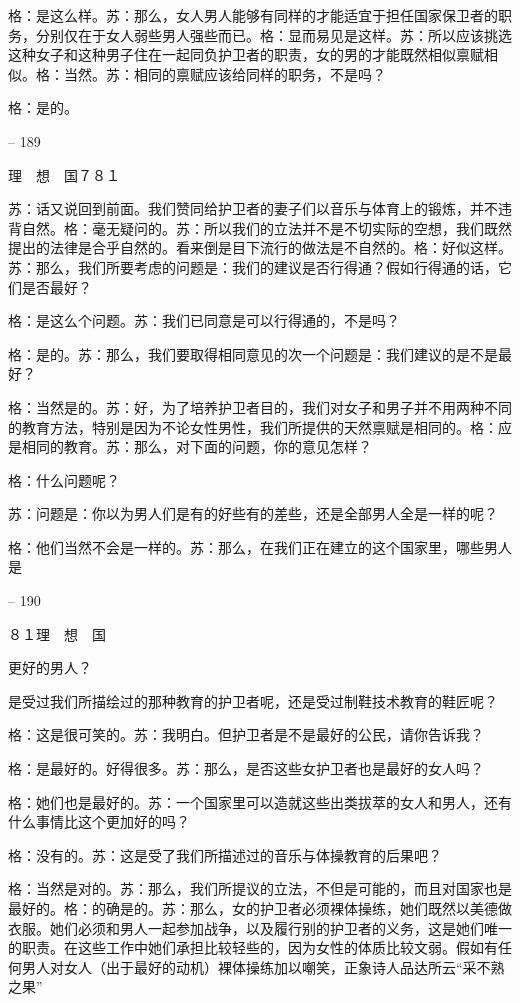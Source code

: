 \documentclass[11pt,oneside]{book}
\begin{document}
\begin{common-format}
    格：是这么样。苏：那么，女人男人能够有同样的才能适宜于担任国家保卫者的职务，分别仅在于女人弱些男人强些而已。格：显而易见是这样。苏：所以应该挑选这种女子和这种男子住在一起同负护卫者的职责，女的男的才能既然相似禀赋相似。格：当然。苏：相同的禀赋应该给同样的职务，不是吗？

    格：是的。

    

-- 189

    理　想　国７８１

    苏：话又说回到前面。我们赞同给护卫者的妻子们以音乐与体育上的锻炼，并不违背自然。格：毫无疑问的。苏：所以我们的立法并不是不切实际的空想，我们既然提出的法律是合乎自然的。看来倒是目下流行的做法是不自然的。格：好似这样。苏：那么，我们所要考虑的问题是：我们的建议是否行得通？假如行得通的话，它们是否最好？

    格：是这么个问题。苏：我们已同意是可以行得通的，不是吗？

    格：是的。苏：那么，我们要取得相同意见的次一个问题是：我们建议的是不是最好？

    格：当然是的。苏：好，为了培养护卫者目的，我们对女子和男子并不用两种不同的教育方法，特别是因为不论女性男性，我们所提供的天然禀赋是相同的。格：应是相同的教育。苏：那么，对下面的问题，你的意见怎样？

    格：什么问题呢？

    苏：问题是：你以为男人们是有的好些有的差些，还是全部男人全是一样的呢？

    格：他们当然不会是一样的。苏：那么，在我们正在建立的这个国家里，哪些男人是

    

-- 190

    ８１理　想　国

    更好的男人？

    是受过我们所描绘过的那种教育的护卫者呢，还是受过制鞋技术教育的鞋匠呢？

    格：这是很可笑的。苏：我明白。但护卫者是不是最好的公民，请你告诉我？

    格：是最好的。好得很多。苏：那么，是否这些女护卫者也是最好的女人吗？

    格：她们也是最好的。苏：一个国家里可以造就这些出类拔萃的女人和男人，还有什么事情比这个更加好的吗？

    格：没有的。苏：这是受了我们所描述过的音乐与体操教育的后果吧？

    格：当然是对的。苏：那么，我们所提议的立法，不但是可能的，而且对国家也是最好的。格：的确是的。苏：那么，女的护卫者必须裸体操练，她们既然以美德做衣服。她们必须和男人一起参加战争，以及履行别的护卫者的义务，这是她们唯一的职责。在这些工作中她们承担比较轻些的，因为女性的体质比较文弱。假如有任何男人对女人（出于最好的动机）裸体操练加以嘲笑，正象诗人品达所云“采不熟之果”


\end{common-format}
\end{document}

